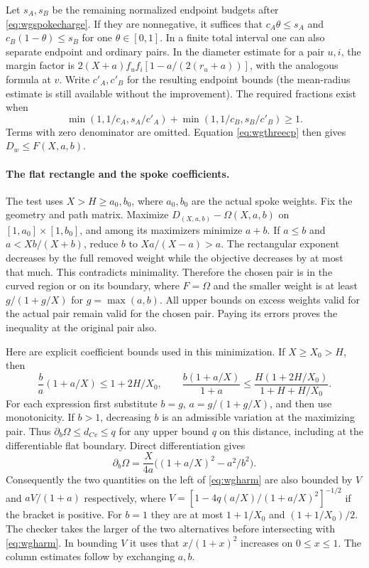 \documentclass[11pt,a4paper]{article}
\theoremstyle{definition}
\begin{document}
Let $s_A,s_B$ be the remaining normalized endpoint budgets after
\eqref{eq:wgspokecharge}. If they are nonnegative, it suffices that
$c_A\theta\le s_A$ and $c_B(1-\theta)\le s_B$ for one $\theta\in[0,1]$.
In a finite total interval one can also separate endpoint and ordinary
pairs. In the diameter estimate for a pair $u,i$, the margin factor is
$2(X+a)f_uf_i[1-a/(2(r_u+a))]$, with the analogous formula at $v$.
Write $c'_A,c'_B$ for the resulting endpoint bounds (the
mean-radius estimate is still available without the improvement).
The required fractions exist when
\begin{equation}
 \min(1,1/c_A,s_A/c'_A)+\min(1,1/c_B,s_B/c'_B)\ge1.
 \label{eq:wgsplit}
\end{equation}
Terms with zero denominator are omitted. Equation \eqref{eq:wgthreecp}
then gives $D_w\le F(X,a,b)$.

\paragraph{The flat rectangle and the spoke coefficients.}
The test uses $X>H\ge a_0,b_0$, where $a_0,b_0$ are the actual
spoke weights. Fix the geometry and path matrix. Maximize
$D_{(X,a,b)}-\Omega(X,a,b)$ on $[1,a_0]\times[1,b_0]$, and among its
maximizers minimize $a+b$. If $a\le b$ and $a<Xb/(X+b)$, reduce $b$
to $Xa/(X-a)>a$. The rectangular exponent decreases by the full removed
weight while the objective decreases by at most that much. This
contradicts minimality. Therefore the chosen pair is in the curved
region or on its boundary, where $F=\Omega$ and the smaller weight
is at least $g/(1+g/X)$ for $g=\max(a,b)$. All upper bounds on excess
weights valid for the actual pair remain valid for the chosen pair.
Paying its errors proves the inequality at the original pair also.

Here are explicit coefficient bounds used in this minimization.
If $X\ge X_0>H$, then
\begin{equation}
 \frac ba(1+a/X)\le1+2H/X_0,\qquad
 \frac{b(1+a/X)}{1+a}\le
 \frac{H(1+2H/X_0)}{1+H+H/X_0}.
 \label{eq:wgharm}
\end{equation}
For each expression first substitute $b=g$, $a=g/(1+g/X)$, and then
use monotonicity. If $b>1$, decreasing $b$ is an admissible variation
at the maximizing pair. Thus $\partial_b\Omega\le d_{Cv}\le q$
for any upper bound $q$ on this distance, including at the differentiable
flat boundary. Direct differentiation gives
\[
 \partial_b\Omega=\frac{X}{4a}\big((1+a/X)^2-a^2/b^2\big).
\]
Consequently the two quantities on the left of \eqref{eq:wgharm}
are also bounded by $V$ and $aV/(1+a)$ respectively, where
$V=[1-4q(a/X)/(1+a/X)^2]^{-1/2}$ if the bracket is positive.
For $b=1$ they are at most $1+1/X_0$ and $(1+1/X_0)/2$.
The checker takes the larger of the two alternatives before
intersecting with \eqref{eq:wgharm}. In bounding $V$ it uses that
$x/(1+x)^2$ increases on $0\le x\le1$. The column estimates follow
by exchanging $a,b$.
\end{document}
